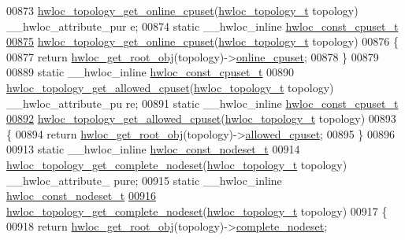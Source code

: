 \begin{DoxyCode}
00873 \hyperlink{a00060_gafeb07985e2cc66aee1da447aff0bcab8}{hwloc_topology_get_online_cpuset}(\hyperlink{a00039_ga9d1e76ee15a7dee158b786c30b6a6e38}{hwloc_topology_t} topology) \_\_hwloc\_attribute\_pur
      e;
00874 \textcolor{keyword}{static} \_\_hwloc\_inline \hyperlink{a00040_ga1f784433e9b606261f62d1134f6a3b25}{hwloc_const_cpuset_t}
\hypertarget{a00031_source_l00875}{}\hyperlink{a00060_gafeb07985e2cc66aee1da447aff0bcab8}{00875} \hyperlink{a00060_gafeb07985e2cc66aee1da447aff0bcab8}{hwloc_topology_get_online_cpuset}(\hyperlink{a00039_ga9d1e76ee15a7dee158b786c30b6a6e38}{hwloc_topology_t} topology)
00876 \{
00877   \textcolor{keywordflow}{return} \hyperlink{a00053_gadbf58f6e187efbdb3cd9a8e30311b7d7}{hwloc_get_root_obj}(topology)->\hyperlink{a00016_a8842d56c2975380f327ea401c5f53564}{online_cpuset};
00878 \}
00879 
00889 \textcolor{keyword}{static} \_\_hwloc\_inline \hyperlink{a00040_ga1f784433e9b606261f62d1134f6a3b25}{hwloc_const_cpuset_t}
00890 \hyperlink{a00060_ga08e3b14e1fe7642b383633d34c1f3c4a}{hwloc_topology_get_allowed_cpuset}(\hyperlink{a00039_ga9d1e76ee15a7dee158b786c30b6a6e38}{hwloc_topology_t} topology) \_\_hwloc\_attribute\_pu
      re;
00891 \textcolor{keyword}{static} \_\_hwloc\_inline \hyperlink{a00040_ga1f784433e9b606261f62d1134f6a3b25}{hwloc_const_cpuset_t}
\hypertarget{a00031_source_l00892}{}\hyperlink{a00060_ga08e3b14e1fe7642b383633d34c1f3c4a}{00892} \hyperlink{a00060_ga08e3b14e1fe7642b383633d34c1f3c4a}{hwloc_topology_get_allowed_cpuset}(\hyperlink{a00039_ga9d1e76ee15a7dee158b786c30b6a6e38}{hwloc_topology_t} topology)
00893 \{
00894   \textcolor{keywordflow}{return} \hyperlink{a00053_gadbf58f6e187efbdb3cd9a8e30311b7d7}{hwloc_get_root_obj}(topology)->\hyperlink{a00016_afa3c59a6dd3da8ffa48710780a1bfb34}{allowed_cpuset};
00895 \}
00896 
00913 \textcolor{keyword}{static} \_\_hwloc\_inline \hyperlink{a00040_ga2f5276235841ad66a79bedad16a5a10c}{hwloc_const_nodeset_t}
00914 \hyperlink{a00061_gaddb7a1f3d71510bb011189e0b8edf29f}{hwloc_topology_get_complete_nodeset}(\hyperlink{a00039_ga9d1e76ee15a7dee158b786c30b6a6e38}{hwloc_topology_t} topology) \_\_hwloc\_attribute\_
      pure;
00915 \textcolor{keyword}{static} \_\_hwloc\_inline \hyperlink{a00040_ga2f5276235841ad66a79bedad16a5a10c}{hwloc_const_nodeset_t}
\hypertarget{a00031_source_l00916}{}\hyperlink{a00061_gaddb7a1f3d71510bb011189e0b8edf29f}{00916} \hyperlink{a00061_gaddb7a1f3d71510bb011189e0b8edf29f}{hwloc_topology_get_complete_nodeset}(\hyperlink{a00039_ga9d1e76ee15a7dee158b786c30b6a6e38}{hwloc_topology_t} topology)
00917 \{
00918   \textcolor{keywordflow}{return} \hyperlink{a00053_gadbf58f6e187efbdb3cd9a8e30311b7d7}{hwloc_get_root_obj}(topology)->\hyperlink{a00016_ac38c4012127525ef74c5615c526f4c2e}{complete_nodeset};

\end{DoxyCode}
